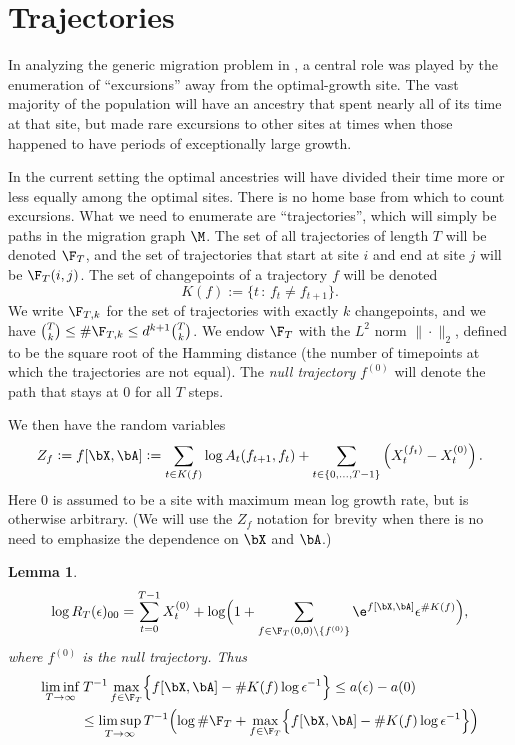 \documentclass[11pt]{amsart}
\newtheorem{lemma}[Thm]{Lemma}
\newcommand{\nc}{\newcommand}
\begin{document}
\section{Trajectories} \label{sec:Trajectories}
In analyzing the generic migration problem in \cite{migration2018}, a central role was played by the
enumeration of ``excursions'' away from the optimal-growth site. The vast majority of the population will have an ancestry that spent nearly all of its time at that site, but made rare excursions to other sites at times when those
happened to have periods of exceptionally large growth.

In the current setting the optimal ancestries will have divided their time more or less equally among the optimal sites. There is no home base from which to count excursions. What we need to enumerate are ``trajectories'', which will simply be
paths in the migration graph $\M$. The set of all trajectories
of length $T$ will be denoted $\F_{T}$, and the set
of trajectories that start at site $i$ and end at site $j$ will be $\F_T(i,j)$. The set of changepoints of a trajectory $f$ will be denoted
$$
K(f):=\{t\, :\, f_{t}\ne f_{t+1}\}.
$$
We write $\F_{T,k}$ for the set of trajectories with exactly $k$ changepoints,
and we have ${\binom{T}{k}\le\#\F_{T,k}\le d^{k+1} \binom{T}{k}}$.
We endow $\F_{T}$ with the $L^{2}$ norm $\|\cdot\|_{2}$, defined to
be the square root of the Hamming distance (the number of timepoints at which the trajectories
are not equal). The {\em null trajectory}
$f^{(0)}$ will denote the path that stays at 0 for all $T$ steps.

\nc{\ff}{\mathbf{f}}
We then have the random variables
$$
Z_{f}:=f[\bX,\bA]:=\sum_{t\in K(f)} \log A_{t}(f_{t+1},f_{t})
   +\sum_{t\in \{0,\dots,T-1\}} \left( X_{t}^{(f_{t})} - X_t^{(0)} \right).
$$
Here $0$ is assumed to be a site with maximum
mean log growth rate, but is otherwise arbitrary.
(We will use the $Z_{f}$ notation for brevity when there is no need
to emphasize the dependence on $\bX$ and $\bA$.)

\begin{lemma} \label{L:allterms2}
\begin{equation} \label{E:allterms2}
\log R_{T}(\epsilon)_{00}=\sum_{t=0}^{T-1}X_{t}^{(0)}
  +\log \Bigl(1+  \sum_{f\in \F_{T}(0,0)\setminus\{f^{(0)}\}} \e^{ f[\bX,\bA] }\epsilon^{\# K(f)}\Bigr),
\end{equation}
where $f^{(0)}$ is the null trajectory. Thus
\begin{equation} \label{E:allterms3}
\begin{split}
\liminf_{T\to\infty} & \: T^{-1} \max_{f\in \F_{T}} \Bigl\{ f[\bX,\bA] - \# K(f)\log\epsilon^{-1} \Bigr\} 
\le a(\epsilon)-a(0)\\
&\le  \limsup_{T\to\infty} T^{-1} \Bigl( \log  \#\F_{T} +\max_{f\in\F_{T}} \Bigl\{f[\bX,\bA ]  - \# K(f)\log\epsilon^{-1}\Bigr\}\Bigr)
\end{split}
\end{equation}
\end{lemma}
\end{document}

